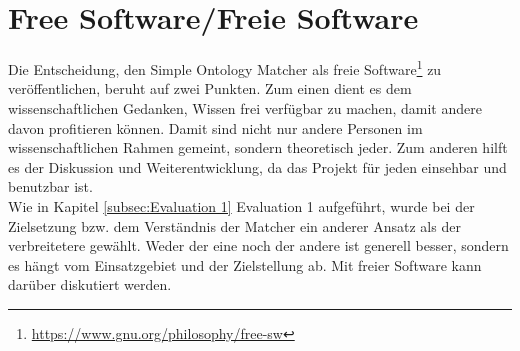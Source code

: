 \section{Free Software/Freie Software}
Die Entscheidung, den Simple Ontology Matcher als freie
Software\footnote{\url{https://www.gnu.org/philosophy/free-sw}} zu veröffentlichen, beruht auf zwei Punkten. Zum einen dient es dem
wissenschaftlichen Gedanken, Wissen frei verfügbar zu machen, damit andere davon
profitieren können. Damit sind nicht nur andere Personen im wissenschaftlichen
Rahmen gemeint, sondern theoretisch jeder. Zum anderen hilft es der Diskussion
und Weiterentwicklung, da das Projekt für jeden einsehbar und benutzbar ist.\\
Wie in Kapitel \ref{subsec:Evaluation 1} Evaluation 1 aufgeführt, wurde bei der
Zielsetzung bzw. dem Verständnis der Matcher ein anderer Ansatz als der
verbreitetere gewählt. Weder der eine noch der andere ist generell besser,
sondern es hängt vom Einsatzgebiet und der Zielstellung ab. Mit freier Software
kann darüber diskutiert werden.

\cleardoublepage
\pagebreak[4]